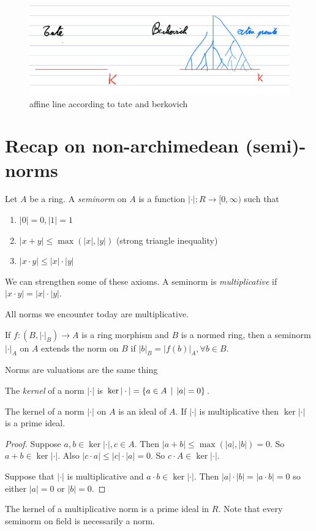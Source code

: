 \documentclass[a4paper]{article}
\begin{document}
\begin{figure}[H]
    \centering
    \includegraphics[width = .9\textwidth]{figures/affine-line-according-to-tate-and-berkovich.png}
    \caption{affine line according to tate and berkovich}
    \label{fig:affine-line-according-to-tate-and-berkovich}
\end{figure}
\section{Recap on non-archimedean (semi)-norms} \label{sec:recap_for_norms}



\begin{definition}
	Let $A$ be a ring. 
	A \emph{seminorm} on $A$ is a function  $|\cdot |: R \to [0, \infty)$ such that 
	\begin{enumerate}
		\item $|0| = 0, |1| = 1$ 
		\item $|x + y| \le \max(|x|, |y|) $ (strong triangle inequality)
		\item $|x\cdot y| \le |x| \cdot |y|$
	\end{enumerate}
	We can strengthen some of these axioms. 
	A seminorm is \emph{multiplicative} if $|x\cdot y| = |x|\cdot |y|$.
\end{definition}
All norms we encounter today are multiplicative. 
\begin{definition}
	If $f: (B, |\cdot |_B) \to A$ is a ring morphism and $B$ is a normed ring, then a seminorm $|\cdot |_A$ on $A$ extends the norm on $B$ if $|b|_B = |f(b)|_A, \forall b \in B$. 
\end{definition}

Norms are valuations are the same thing
\begin{definition}
	The \emph{kernel} of a norm $|\cdot |$ is $\ker |\cdot | =\{a \in A \st |a| = 0\} $. 
\end{definition}
\begin{proposition}
	The kernel of a norm $|\cdot |$ on $A$ is an ideal of $A$. 
	If $|\cdot |$ is multiplicative then $\ker |\cdot | $ is a prime ideal. 

\end{proposition}
\begin{proof}
	Suppose $a, b \in \ker |\cdot |, c \in A$. 
	Then $|a + b| \le \max(|a|, |b|) = 0$. So  $a + b \in \ker |\cdot |$. 
	Also $|c\cdot a| \le |c| \cdot |a| =0$. So $c\cdot A \in\ker|\cdot |$. 

	Suppose that $|\cdot |$ is multiplicative and $a\cdot b \in \ker|\cdot |$.
	Then $|a|\cdot |b| = |a\cdot b| =0$ so either $|a| = 0$ or $|b| = 0$. 
\end{proof}
The kernel of a multiplicative norm is a prime ideal in $R$. 
Note that every seminorm on field is necessarily a norm. 
\end{document}
